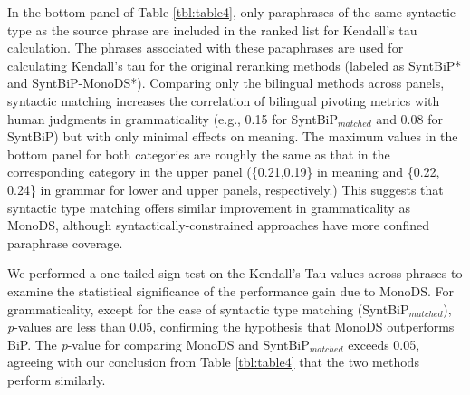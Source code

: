 \documentclass[11pt]{article}
\newcommand{\mnote}[1]{\marginpar{\raggedleft\footnotesize\itshape#1}}
\begin{document}
In the bottom panel of Table \ref{tbl:table4}, only paraphrases of the same syntactic type as the source phrase are included in the ranked list for Kendall's tau calculation. The phrases associated with these paraphrases are used for calculating Kendall's tau for the original reranking methods (labeled as SyntBiP* and SyntBiP-MonoDS*). Comparing only the bilingual methods across panels, syntactic matching increases the correlation of bilingual pivoting metrics with human judgments in grammaticality (e.g., 0.15 for SyntBiP$_{matched}$ and 0.08 for SyntBiP) but with only minimal effects on meaning. The maximum values in the bottom panel for both categories are roughly the same as that in the corresponding category in the upper panel (\{0.21,0.19\} in meaning and \{0.22, 0.24\} in grammar for lower and upper panels, respectively.) This suggests that syntactic type matching offers similar improvement in grammaticality as MonoDS, although syntactically-constrained approaches have more confined paraphrase coverage.

We performed a one-tailed sign test on the Kendall's Tau values across phrases to examine the statistical significance of the performance gain due to MonoDS. For grammaticality, except for the case of syntactic type matching (SyntBiP$_{matched}$), \emph{p}-values are less than 0.05, confirming the hypothesis that MonoDS outperforms BiP. The \emph{p}-value for comparing MonoDS and SyntBiP$_{matched}$ exceeds 0.05, agreeing with our conclusion from Table \ref{tbl:table4} that the two methods perform similarly.
\end{document}
